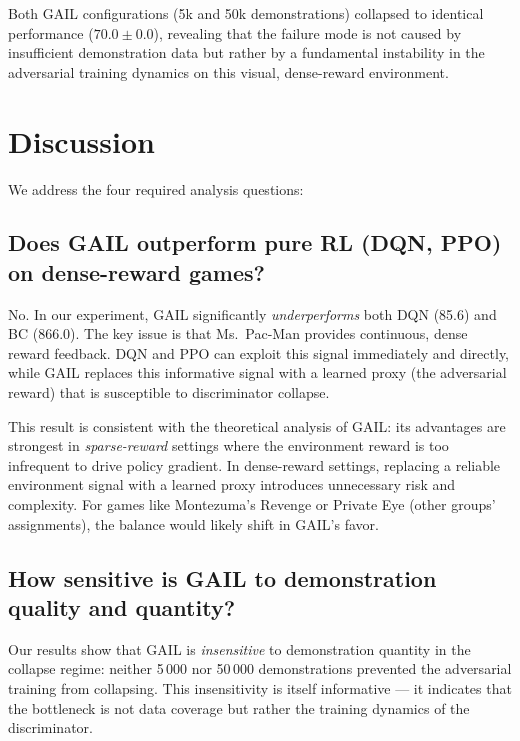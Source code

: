 \documentclass[conference]{IEEEtran}
\begin{document}
Both GAIL configurations (5k and 50k demonstrations) collapsed to identical performance
($70.0 \pm 0.0$), revealing that the failure mode is not caused by insufficient
demonstration data but rather by a fundamental instability in the adversarial training
dynamics on this visual, dense-reward environment.

\section{Discussion}
\label{sec:discussion}

We address the four required analysis questions:

\subsection{Does GAIL outperform pure RL (DQN, PPO) on dense-reward games?}

No. In our experiment, GAIL significantly \emph{underperforms} both DQN (85.6) and BC
(866.0).
The key issue is that Ms.\ Pac-Man provides continuous, dense reward feedback.
DQN and PPO can exploit this signal immediately and directly, while GAIL replaces this
informative signal with a learned proxy (the adversarial reward) that is susceptible to
discriminator collapse.

This result is consistent with the theoretical analysis of GAIL: its advantages are
strongest in \emph{sparse-reward} settings where the environment reward is too infrequent
to drive policy gradient.
In dense-reward settings, replacing a reliable environment signal with a learned proxy
introduces unnecessary risk and complexity.
For games like Montezuma's Revenge or Private Eye (other groups' assignments), the
balance would likely shift in GAIL's favor.

\subsection{How sensitive is GAIL to demonstration quality and quantity?}

Our results show that GAIL is \emph{insensitive} to demonstration quantity in the
collapse regime: neither 5\,000 nor 50\,000 demonstrations prevented the adversarial
training from collapsing.
This insensitivity is itself informative — it indicates that the bottleneck is not
data coverage but rather the training dynamics of the discriminator.
\end{document}
